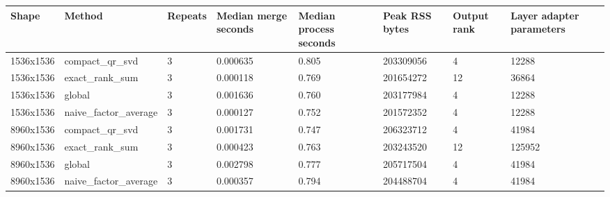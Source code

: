 \begin{tabular}{llllllll}
\hline
Shape & Method & Repeats & Median merge seconds & Median process seconds & Peak RSS bytes & Output rank & Layer adapter parameters \\
\hline
1536x1536 & compact\_qr\_svd & 3 & 0.000635 & 0.805 & 203309056 & 4 & 12288 \\
1536x1536 & exact\_rank\_sum & 3 & 0.000118 & 0.769 & 201654272 & 12 & 36864 \\
1536x1536 & global & 3 & 0.001636 & 0.760 & 203177984 & 4 & 12288 \\
1536x1536 & naive\_factor\_average & 3 & 0.000127 & 0.752 & 201572352 & 4 & 12288 \\
8960x1536 & compact\_qr\_svd & 3 & 0.001731 & 0.747 & 206323712 & 4 & 41984 \\
8960x1536 & exact\_rank\_sum & 3 & 0.000423 & 0.763 & 203243520 & 12 & 125952 \\
8960x1536 & global & 3 & 0.002798 & 0.777 & 205717504 & 4 & 41984 \\
8960x1536 & naive\_factor\_average & 3 & 0.000357 & 0.794 & 204488704 & 4 & 41984 \\
\hline
\end{tabular}
